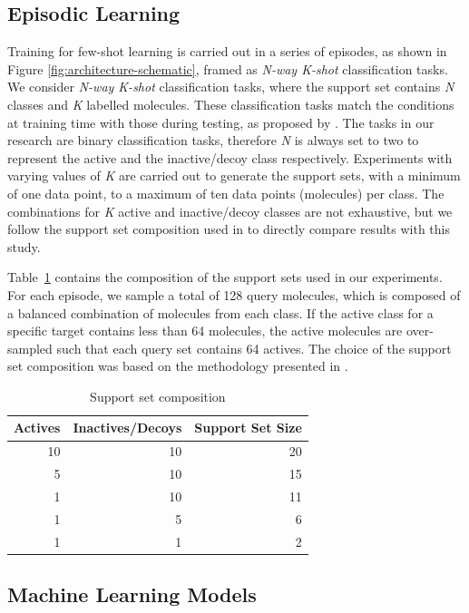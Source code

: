 \subsection{Episodic Learning}

Training for few-shot learning is carried out in a series of episodes, as shown in Figure \ref{fig:architecture-schematic}, framed as \textit{N-way K-shot} classification tasks. We consider \textit{N-way K-shot} classification tasks, where the support set contains \textit{N} classes and \textit{K} labelled molecules. These classification tasks match the conditions at training time with those during testing, as proposed by \citet{vinyals2016matching}. The tasks in our research are binary classification tasks, therefore \textit{N} is always set to two to represent the active and the inactive/decoy class respectively. Experiments with varying values of \textit{K} are carried out to generate the support sets, with a minimum of one data point, to a maximum of ten data points (molecules) per class. The combinations for \textit{K} active and inactive/decoy classes are not exhaustive, but we follow the support set composition used in \citet{altae2017low} to directly compare results with this study.

Table~\ref{table:support-set-sizes} contains the composition of the support sets used in our experiments. For each episode, we sample a total of 128 query molecules, which is composed of a balanced combination of molecules from each class. If the active class for a specific target contains less than 64 molecules, the active molecules are over-sampled such that each query set contains 64 actives. The choice of the support set composition was based on the methodology presented in \citet{altae2017low}.

\begin{table}
	\centering
	\begin{tabular}{@{}rrr@{}}
		\hline
		Actives & Inactives/Decoys & Support Set Size \\
		\hline
		10  & 10 & 20 \\
		5   & 10 & 15 \\
		1   & 10 & 11 \\
		1   & 5  & 6 \\
		1   & 1  & 2 \\
		\hline
	\end{tabular}
	\caption{Support set composition}
	\label{table:support-set-sizes}
\end{table}

\subsection{Machine Learning Models}

